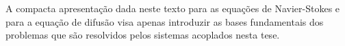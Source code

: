 A compacta apresentação dada neste texto para as equações de Navier-Stokes e para a
equação de difusão visa apenas introduzir
as bases fundamentais dos problemas que são resolvidos pelos sistemas acoplados nesta tese.




